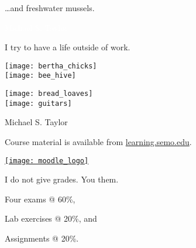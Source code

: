 \documentclass[t]{beamer}
\newcommand{\btVFill}{\vskip0pt plus 1filll}
\begin{document}
%
{
	\begin{frame}[t]{\dots and freshwater mussels.}
		
		\vfilll

		\tiny \textcolor{white}{Michael S. Taylor }
	\end{frame}
}
%
\begin{frame}[t]{I try to have a life outside of work.}

	\vspace*{-\baselineskip}
	
	\begin{multicols}{2}
		\texttt{[image: bertha\_chicks]} \\[1ex]
		\texttt{[image: bee\_hive]} \\
		
	\columnbreak
		
		\texttt{[image: bread\_loaves]} \\[1ex]
		\texttt{[image: guitars]} \\
		
	\end{multicols}
		
		\vfilll

	\hfill \tiny Michael S. Taylor 

\end{frame}
%
\begin{frame}[t]{Course material is available from \href{http://learning.semo.edu}{learning.semo.edu}.}
	\begin{center}
		
		\href{http://learning.semo.edu}{\texttt{[image: moodle\_logo]}}
		
		\medskip
		
	\end{center}
	
\end{frame}
%
\begin{frame}[t]{I do not give grades. You  them.}

	\hangpara Four exams @ 60\%,

	\hangpara Lab exercises @ 20\%, and

	\hangpara Assignments @ 20\%.

\end{frame}
%

%
%
%
%
%
\end{document}
